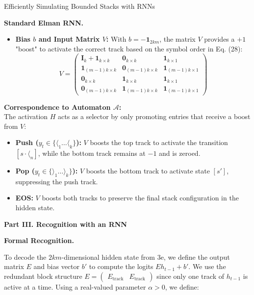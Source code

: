 \begin{question}{Efficiently Simulating Bounded Stacks with RNNs}
\begin{subquestion}{\textbf{Standard Elman RNN.}}
\begin{itemize}
    \item \textbf{Bias $b$ and Input Matrix $V$:} 
    With $b = -\mathbf{1}_{2km}$, the matrix $V$ provides a $+1$ "boost" to activate the correct track based on the symbol order in Eq. (28):
    \[
    V = \begin{pmatrix}
        \mathbf{I}_{k} + \mathbf{1}_{k \times k} & \mathbf{0}_{k \times k} & \mathbf{1}_{k \times 1} \\
        \mathbf{1}_{(m-1)k \times k} & \mathbf{0}_{(m-1)k \times k} & \mathbf{1}_{(m-1)k \times 1} \\
        \mathbf{0}_{k \times k} & \mathbf{1}_{k \times k} & \mathbf{1}_{k \times 1} \\
        \mathbf{0}_{(m-1)k \times k} & \mathbf{1}_{(m-1)k \times k} & \mathbf{1}_{(m-1)k \times 1}
    \end{pmatrix}
    \]

\end{itemize}

\textbf{Correspondence to Automaton $\mathcal{A}$:} \\
The activation $H$ acts as a selector by only promoting entries that receive a boost from $V$:
\begin{itemize}
    \item \textbf{Push ($y_t \in \{\langle_1 \dots \langle_k\}$):} $V$ boosts the top track to activate the transition $[s \cdot \langle_n]$, while the bottom track remains at $-1$ and is zeroed.
    \item \textbf{Pop ($y_t \in \{\rangle_1 \dots \rangle_k\}$):} $V$ boosts the bottom track to activate state $[s']$, suppressing the push track.
    \item \textbf{EOS:} $V$ boosts both tracks to preserve the final stack configuration in the hidden state.
\end{itemize}

\end{subquestion}

\textbf{Part III. Recognition with an RNN}

\begin{subquestion}{\textbf{Formal Recognition.}}

To decode the $2km$-dimensional hidden state from 3e, we define the output matrix $E$ and bias vector $b'$ to compute the logits $Eh_{t-1} + b'$. We use the redundant block structure $E = \begin{pmatrix} E_{\text{track}} & E_{\text{track}} \end{pmatrix}$ since only one track of $h_{t-1}$ is active at a time. Using a real-valued parameter $\alpha > 0$, we define:


\end{subquestion}
\end{question}
